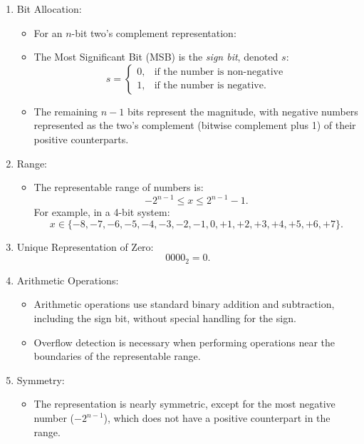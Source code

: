 \begin{enumerate}[left=1cm]
    \item Bit Allocation:
    \begin{itemize}
        \item For an \( n \)-bit two's complement representation:
        \item The Most Significant Bit (MSB) is the \textit{sign bit}, denoted \( s \):
       \[
       s = 
       \begin{cases} 
       0, & \text{if the number is non-negative} \\
       1, & \text{if the number is negative.}
       \end{cases}
       \]
        \item The remaining \( n-1 \) bits represent the magnitude, with negative numbers represented as the two's complement (bitwise complement plus 1) of their positive counterparts.
    \end{itemize}

    \item Range:
    \begin{itemize}
        \item The representable range of numbers is:
     \[
     -2^{n-1} \leq x \leq 2^{n-1} - 1.
     \]
     For example, in a 4-bit system:
     \[
     x \in \{-8, -7, -6, -5, -4, -3, -2, -1, 0, +1, +2, +3, +4, +5, +6, +7\}.
     \]
     \end{itemize}

    \item Unique Representation of Zero:
     \[
     0000_2 = 0.
     \]

    \item Arithmetic Operations:
    \begin{itemize}
        \item Arithmetic operations use standard binary addition and subtraction, including the sign bit, without special handling for the sign.
        \item Overflow detection is necessary when performing operations near the boundaries of the representable range.
    \end{itemize}

    \item Symmetry:
    \begin{itemize}
        \item The representation is nearly symmetric, except for the most negative number (\( -2^{n-1} \)), which does not have a positive counterpart in the range.
    \end{itemize}


\end{enumerate}
